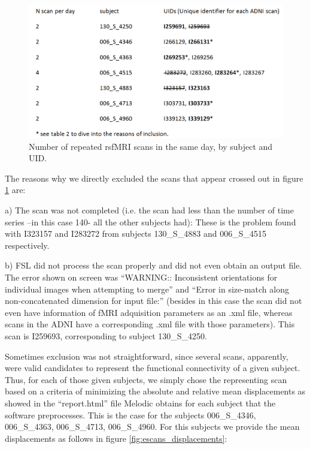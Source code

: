 \FloatBarrier
\begin{figure}[h]
	\centering
	\includegraphics[width=\textwidth]{fig_escans_exclosos.png}
	\caption{Number of repeated rsfMRI scans in the same day, by subject and UID.}
	\label{fig:escans_exclosos}
\end{figure}
\FloatBarrier


The reasons why we directly excluded the scans that appear crossed out in figure \ref{fig:escans_exclosos} are:

a)	The scan was not completed (i.e. the scan had less than the number of time series –in this case 140- all the other subjects had): These is the problem found with I323157 and I283272 from subjects 130\_S\_4883 and 006\_S\_4515 respectively.

b)	FSL did not process the scan properly and did not even obtain an output file. The error shown on screen was ``WARNING:: Inconsistent orientations for individual images when attempting to merge'' and ``Error in size-match along non-concatenated dimension for input file:''  (besides in this case the scan did not even have information of fMRI adquisition parameters as an .xml file, whereas scans in the ADNI have a corresponding .xml file with those parameters). This  scan is I259693, corresponding to subject 130\_S\_4250. 

Sometimes exclusion was not straightforward, since several scans, apparently, were valid candidates to represent the functional connectivity of a given subject. Thus, for each of those given subjects,  we simply chose the representing scan based on a criteria of minimizing the absolute and relative mean displacements as showed in the “report.html” file Melodic obtains for each subject that the software preprocesses. This is the case for  the subjects  006\_S\_4346,  006\_S\_4363,  006\_S\_4713,  006\_S\_4960. For this subjects we provide the mean displacements as follows in figure \ref{fig:escans_displacements}:


